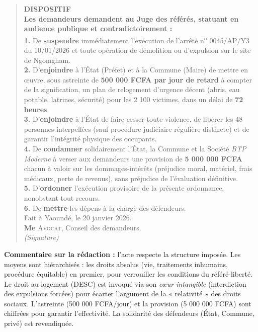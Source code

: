 \documentclass[11pt]{article}
\begin{document}
\begin{exoresolu}
\begin{quote}
\textbf{DISPOSITIF}\\
\textbf{Les demandeurs demandent au Juge des référés, statuant en audience publique et contradictoirement :}\\
\textbf{1.} De \textbf{suspendre} immédiatement l'exécution de l'arrêté n\textsuperscript{o} 0045/AP/Y3 du 10/01/2026 et toute opération de démolition ou d'expulsion sur le site de Ngomgham.\\
\textbf{2.} D'\textbf{enjoindre} à l'État (Préfet) et à la Commune (Maire) de mettre en œuvre, sous astreinte de \textbf{500 000 FCFA par jour de retard} à compter de la signification, un plan de relogement d'urgence décent (abris, eau potable, latrines, sécurité) pour les 2 100 victimes, dans un délai de \textbf{72 heures}.\\
\textbf{3.} D'\textbf{enjoindre} à l'État de faire cesser toute violence, de libérer les 48 personnes interpellées (sauf procédure judiciaire régulière distincte) et de garantir l'intégrité physique des occupants.\\
\textbf{4.} De \textbf{condamner} solidairement l'État, la Commune et la Société \emph{BTP Moderne} à verser aux demandeurs une provision de \textbf{5 000 000 FCFA} chacun à valoir sur les dommages-intérêts (préjudice moral, matériel, frais médicaux, perte de revenus), sans préjudice de l'évaluation définitive.\\
\textbf{5.} D'\textbf{ordonner} l'exécution provisoire de la présente ordonnance, nonobstant tout recours.\\
\textbf{6.} De \textbf{mettre} les dépens à la charge des défendeurs.\\\vspace{0.3cm}
Fait à Yaoundé, le 20 janvier 2026.\\
\textbf{Me} \textsc{Avocat}, Conseil des demandeurs.\\
\textit{(Signature)}
\end{quote}

\textbf{Commentaire sur la rédaction :} l'acte respecte la structure imposée. Les moyens sont hiérarchisés : les droits absolus (vie, traitements inhumains, procédure équitable) en premier, pour verrouiller les conditions du référé-liberté. Le droit au logement (DESC) est invoqué via son \emph{cœur intangible} (interdiction des expulsions forcées) pour écarter l'argument de la « relativité » des droits sociaux. L'astreinte (500 000 FCFA/jour) et la provision (5 000 000 FCFA) sont chiffrées pour garantir l'effectivité. La solidarité des défendeurs (État, Commune, privé) est revendiquée.


\end{exoresolu}
\end{document}
